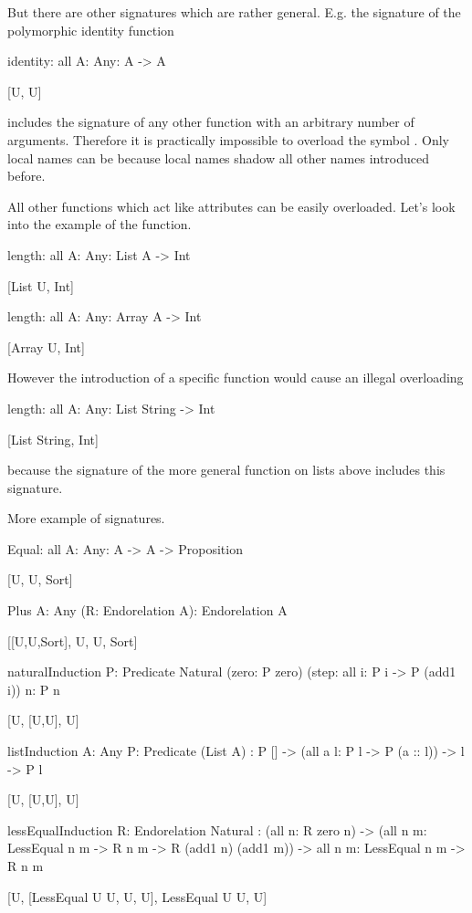 But there are other signatures which are rather general. E.g. the signature of
the polymorphic identity function
%
\begin{alba}
    identity: all {A: Any}: A -> A

        [U, U]
\end{alba}
%
includes the signature of any other function with an arbitrary number of
arguments. Therefore it is practically impossible to overload the symbol
. Only local names can be  because local names
shadow all other names introduced before.

All other functions which act like attributes can be easily overloaded. Let's
look into the example of the  function.

\begin{alba}
    length: all {A: Any}: List A -> Int

        [List U, Int]


    length: all {A: Any}: Array A -> Int

        [Array U, Int]
\end{alba}
%
However the introduction of a specific  function would cause an
illegal overloading
\begin{alba}
    length: all {A: Any}: List String -> Int

        [List String, Int]
\end{alba}
because the signature of the more general  function on lists above
includes this signature.


More example of signatures.
%
\begin{alba}

    Equal: all {A: Any}: A -> A -> Proposition

        [U, U, Sort]


    Plus {A: Any} (R: Endorelation A): Endorelation A

        [[U,U,Sort], U, U, Sort]


    naturalInduction
        {P: Predicate Natural}
        (zero: P zero) (step: all {i}: P i -> P (add1 i))
        {n}: P n

        [U, [U,U], U]


    listInduction
        {A: Any} {P: Predicate (List A)}
        : P [] -> (all {a l}: P l -> P (a :: l)) -> {l} -> P l

        [U, [U,U], U]


    lessEqualInduction {R: Endorelation Natural}
        :   (all {n}: R zero n)
            -> (all {n m}: LessEqual n m -> R n m -> R (add1 n) (add1 m))
            -> all {n m}: LessEqual n m -> R n m

        [U, [LessEqual U U, U, U], LessEqual U U, U]

\end{alba}




